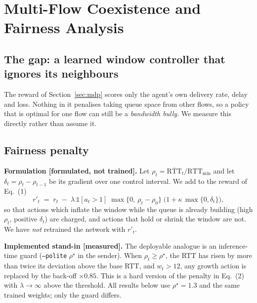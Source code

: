 \section{Multi-Flow Coexistence and Fairness Analysis}
\label{sec:fairness}

\subsection{The gap: a learned window controller that ignores its neighbours}
The reward of Section~\ref{sec:mdp} scores only the agent's own delivery rate, delay and loss. Nothing in it penalises taking queue space from other flows, so a policy that is optimal for one flow can still be a \emph{bandwidth bully}. We measure this directly rather than assume it.

\subsection{Fairness penalty}
\textbf{Formulation [formulated, not trained].} Let $\rho_t=\overline{\mathrm{RTT}}_t/\mathrm{RTT}_{\min}$ and let $\delta_t=\rho_t-\rho_{t-1}$ be its gradient over one control interval. We add to the reward of Eq.~(1)
\begin{equation}
r'_t \;=\; r_t \;-\; \lambda\,\mathbb{1}[a_t>1]\;\max\{0,\ \rho_t-\rho_0\}\;\bigl(1+\kappa\,\max\{0,\delta_t\}\bigr),
\end{equation}
so that actions which inflate the window while the queue is already building (high $\rho_t$, positive $\delta_t$) are charged, and actions that hold or shrink the window are not. We have \emph{not} retrained the network with $r'_t$.

\textbf{Implemented stand-in [measured].} The deployable analogue is an inference-time guard (\texttt{--polite} $\rho^\star$ in the sender). When $\rho_t\ge\rho^\star$, the RTT has risen by more than twice its deviation above the base RTT, and $w_t>12$, any growth action is replaced by the back-off $\times0.85$. This is a hard version of the penalty in Eq.~(2) with $\lambda\to\infty$ above the threshold. All results below use $\rho^\star=1.3$ and the same trained weights; only the guard differs.

